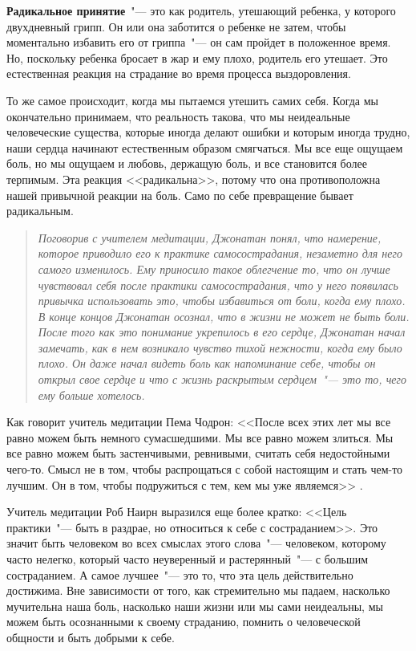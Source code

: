 \textbf{Радикальное принятие}~"--- это как родитель, утешающий ребенка, у которого двухдневный грипп. Он или она заботится о ребенке не затем, чтобы моментально избавить его от гриппа~"--- он сам пройдет в положенное время. Но, поскольку ребенка бросает в жар и ему плохо, родитель его утешает. Это естественная реакция на страдание во время процесса выздоровления.

То же самое происходит, когда мы пытаемся утешить самих себя. Когда мы окончательно принимаем, что реальность такова, что мы неидеальные человеческие существа, которые иногда делают ошибки и которым иногда трудно, наши сердца начинают естественным образом смягчаться. Мы все еще ощущаем боль, но мы ощущаем и любовь, держащую боль, и все становится более терпимым. Эта реакция <<радикальна>>, потому что она противоположна нашей привычной реакции на боль. Само по себе превращение бывает радикальным. 

\begin{quotation}
	\textit{
		Поговорив с учителем медитации, Джонатан понял, что намерение, которое приводило его к  	практике самосострадания, незаметно для него самого изменилось. Ему приносило такое облегчение то, что он лучше чувствовал себя после практики самосострадания, что у него появилась привычка использовать это, чтобы избавиться от боли, когда ему плохо. В конце концов Джонатан осознал, что в жизни не может не быть боли. После того как это понимание укрепилось в его сердце, Джонатан начал замечать, как в нем возникало чувство тихой нежности, когда ему было плохо. Он даже начал видеть боль как напоминание себе, чтобы он открыл свое сердце и что с жизнь раскрытым сердцем~"--- это то, чего ему больше хотелось.
	}
\end{quotation}

Как говорит учитель медитации Пема Чодрон: <<После всех этих лет мы все равно можем быть немного сумасшедшими. Мы все равно можем злиться. Мы все равно можем быть застенчивыми, ревнивыми, считать себя недостойными чего-то. Смысл не в том, чтобы распрощаться с собой настоящим и стать чем-то лучшим. Он в том, чтобы подружиться с тем, кем мы уже являемся>> \cite{80}.

Учитель медитации Роб Наирн выразился еще более кратко: <<Цель практики~"--- быть в раздрае, но относиться к себе с состраданием>>\cite{81}. Это значит быть человеком во всех смыслах этого слова~"--- человеком, которому часто нелегко, который часто неуверенный и растерянный~"--- с большим состраданием.  А самое лучшее~"--- это то, что эта цель действительно достижима. Вне зависимости от того, как стремительно мы падаем, насколько мучительна наша боль, насколько наши жизни или мы сами неидеальны, мы можем быть осознанными к своему страданию, помнить о человеческой общности и быть добрыми к себе.

